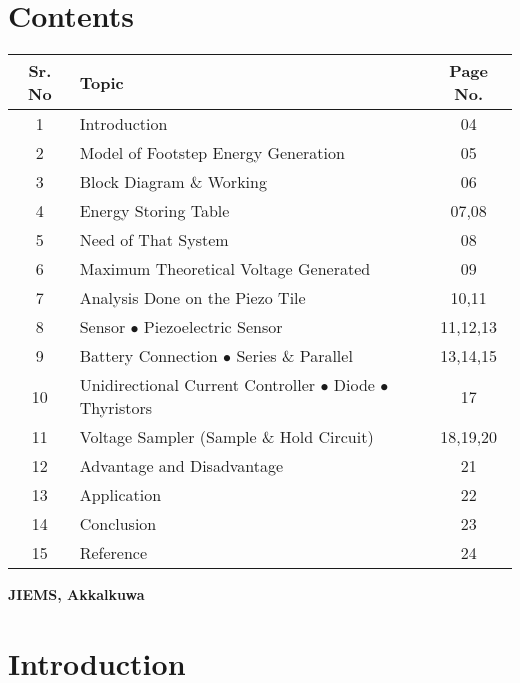 \documentclass[12pt]{article}
\begin{document}
\section*{Contents}
\begin{table}[h!]
\centering
\begin{tabular}{|c|p{9cm}|c|}
\hline
\textbf{Sr. No} & \textbf{Topic} & \textbf{Page No.} \\ \hline
1  & Introduction & 04 \\ \hline
2  & Model of Footstep Energy Generation & 05 \\ \hline
3  & Block Diagram \& Working & 06 \\ \hline
4  & Energy Storing Table & 07,08 \\ \hline
5  & Need of That System & 08 \\ \hline
6  & Maximum Theoretical Voltage Generated & 09 \\ \hline
7  & Analysis Done on the Piezo Tile & 10,11 \\ \hline
8  & Sensor \newline $\bullet$ Piezoelectric Sensor & 11,12,13 \\ \hline
9  & Battery Connection \newline $\bullet$ Series \& Parallel & 13,14,15 \\ \hline
10 & Unidirectional Current Controller \newline $\bullet$ Diode \newline $\bullet$ Thyristors & 17 \\ \hline
11 & Voltage Sampler (Sample \& Hold Circuit) & 18,19,20 \\ \hline
12 & Advantage and Disadvantage & 21 \\ \hline
13 & Application & 22 \\ \hline
14 & Conclusion & 23 \\ \hline
15 & Reference & 24 \\ \hline
\end{tabular}
\end{table}

\vspace{1cm}

\begin{flushright}
    \textbf{JIEMS, Akkalkuwa}
\end{flushright}

\newpage 

\section*{Introduction}
\end{document}
